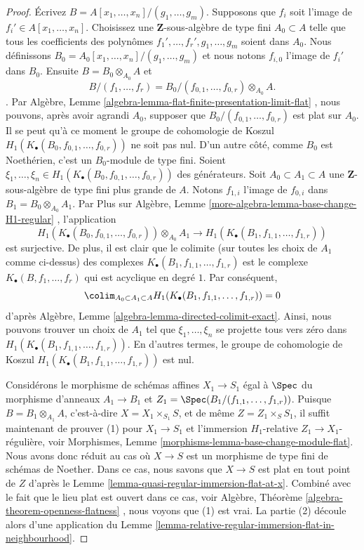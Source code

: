 \begin{proof}
\medskip\noindent
Écrivez  $B = A[x_1, \ldots, x_n]/(g_1, \ldots, g_m)$. Supposons que  $f_i$  soit l'image de  $f_i' \in A[x_1, \ldots, x_n]$.
Choisissez une  $\mathbf{Z}$-sous-algèbre de type fini  $A_0 \subset A$  telle que tous
les coefficients des polynômes  $f_1', \ldots, f_r', g_1, \ldots, g_m$  soient dans  $A_0$. Nous
définissons  $B_0 = A_0[x_1, \ldots, x_n]/(g_1, \ldots, g_m)$  et nous notons  $f_{i, 0}$  l'image de  $f_i'$  dans
 $B_0$. Ensuite  $B = B_0 \otimes_{A_0} A$  et
$$
B/(f_1, \ldots, f_r) =
B_0/(f_{0, 1}, \ldots, f_{0, r}) \otimes_{A_0} A.
$$
. Par Algèbre, Lemme  \ref{algebra-lemma-flat-finite-presentation-limit-flat} , nous pouvons, après avoir agrandi  $A_0$,
supposer que  $B_0/(f_{0, 1}, \ldots, f_{0, r})$  est plat sur  $A_0$. Il se peut qu'à ce moment le
groupe de cohomologie de Koszul  $H_1(K_\bullet(B_0, f_{0, 1}, \ldots, f_{0, r}))$  ne soit pas nul. D'un autre côté,
comme  $B_0$  est Noethérien, c'est un  $B_0$-module de type fini.
Soient  $\xi_1, \ldots, \xi_n \in H_1(K_\bullet(B_0, f_{0, 1}, \ldots, f_{0, r}))$  des générateurs. Soit  $A_0 \subset A_1 \subset A$  une
 $\mathbf{Z}$-sous-algèbre de type fini plus grande de  $A$. Notons
 $f_{1, i}$  l'image de  $f_{0, i}$  dans  $B_1 = B_0 \otimes_{A_0} A_1$. Par Plus sur Algèbre,
Lemme  \ref{more-algebra-lemma-base-change-H1-regular} , l'application
$$
H_1(K_\bullet(B_0, f_{0, 1}, \ldots, f_{0, r})) \otimes_{A_0} A_1
\longrightarrow
H_1(K_\bullet(B_1, f_{1, 1}, \ldots, f_{1, r}))
$$
est surjective. De plus, il est clair que le colimite (sur toutes les choix de
 $A_1$  comme ci-dessus) des complexes  $K_\bullet(B_1, f_{1, 1}, \ldots, f_{1, r})$  est le complexe
 $K_\bullet(B, f_1, \ldots, f_r)$  qui est acyclique en degré  $1$. Par conséquent,
$$
\colim_{A_0 \subset A_1 \subset A}
H_1(K_\bullet(B_1, f_{1, 1}, \ldots, f_{1, r}))
= 0
$$
d'après Algèbre, Lemme  \ref{algebra-lemma-directed-colimit-exact}. Ainsi, nous pouvons trouver un choix de
 $A_1$  tel que  $\xi_1, \ldots, \xi_n$  se projette tous vers zéro dans  $H_1(K_\bullet(B_1, f_{1, 1}, \ldots, f_{1, r}))$. En
d'autres termes, le groupe de cohomologie de Koszul  $H_1(K_\bullet(B_1, f_{1, 1}, \ldots, f_{1, r}))$  est nul.

\medskip\noindent
Considérons le morphisme de schémas affines  $X_1 \to S_1$  égal à  $\Spec$  du
morphisme d'anneaux  $A_1 \to B_1$  et  $Z_1 = \Spec(B_1/(f_{1, 1}, \ldots, f_{1, r}))$. Puisque  $B = B_1 \otimes_{A_1} A$,
c'est-à-dire  $X = X_1 \times_{S_1} S$, et de même  $Z = Z_1 \times_S S_1$, il suffit maintenant de
prouver (1) pour  $X_1 \to S_1$  et l'immersion  $H_1$-relative
 $Z_1 \to X_1$-régulière, voir Morphismes, Lemme  \ref{morphisms-lemma-base-change-module-flat}. Nous avons donc
réduit au cas où  $X \to S$  est un morphisme de type fini de schémas de Noether.
Dans ce cas, nous savons que  $X \to S$  est plat en tout point de  $Z$ 
d'après le Lemme  \ref{lemma-quasi-regular-immersion-flat-at-x}. Combiné avec le fait que le lieu plat est ouvert
dans ce cas, voir Algèbre, Théorème  \ref{algebra-theorem-openness-flatness} , nous voyons que (1) est vrai. La
partie (2) découle alors d'une application du Lemme  \ref{lemma-relative-regular-immersion-flat-in-neighbourhood}.
\end{proof}

